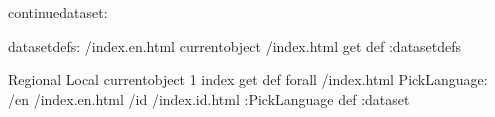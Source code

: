 \begin{ingrid}
continuedataset:

datasetdefs:
/index.en.html currentobject /index.html get def
:datasetdefs

{ Regional Local } { currentobject 1 index get def } forall
/index.html {
PickLanguage:
/en /index.en.html
/id /index.id.html
:PickLanguage
} def
:dataset
\end{ingrid}
